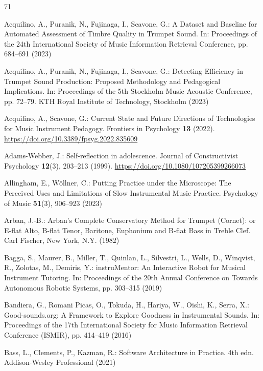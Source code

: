 \documentclass[runningheads]{llncs}
\begin{document}
\begin{thebibliography}{71}
\sloppy
\raggedright

Acquilino, A., Puranik, N., Fujinaga, I., Scavone, G.: A Dataset and Baseline for Automated Assessment of Timbre Quality in Trumpet Sound. In: Proceedings of the 24th International Society of Music Information Retrieval Conference, pp. 684--691 (2023)

Acquilino, A., Puranik, N., Fujinaga, I., Scavone, G.: Detecting Efficiency in Trumpet Sound Production: Proposed Methodology and Pedagogical Implications. In: Proceedings of the 5th Stockholm Music Acoustic Conference, pp. 72--79. KTH Royal Institute of Technology, Stockholm (2023)

Acquilino, A., Scavone, G.: Current State and Future Directions of Technologies for Music Instrument Pedagogy. Frontiers in Psychology \textbf{13} (2022). \url{https://doi.org/10.3389/fpsyg.2022.835609}

Adams-Webber, J.: Self-reflection in adolescence. Journal of Constructivist Psychology \textbf{12}(3), 203--213 (1999). \url{https://doi.org/10.1080/107205399266073}

Allingham, E., Wöllner, C.: Putting Practice under the Microscope: The Perceived Uses and Limitations of Slow Instrumental Music Practice. Psychology of Music \textbf{51}(3), 906--923 (2023)

Arban, J.-B.: Arban's Complete Conservatory Method for Trumpet (Cornet): or E-flat Alto, B-flat Tenor, Baritone, Euphonium and B-flat Bass in Treble Clef. Carl Fischer, New York, N.Y. (1982)

Bagga, S., Maurer, B., Miller, T., Quinlan, L., Silvestri, L., Wells, D., Winqvist, R., Zolotas, M., Demiris, Y.: instruMentor: An Interactive Robot for Musical Instrument Tutoring. In: Proceedings of the 20th Annual Conference on Towards Autonomous Robotic Systems, pp. 303--315 (2019)

Bandiera, G., Romani Picas, O., Tokuda, H., Hariya, W., Oishi, K., Serra, X.: Good-sounds.org: A Framework to Explore Goodness in Instrumental Sounds. In: Proceedings of the 17th International Society for Music Information Retrieval Conference (ISMIR), pp. 414--419 (2016)

Bass, L., Clements, P., Kazman, R.: Software Architecture in Practice. 4th edn. Addison-Wesley Professional (2021)


\end{thebibliography}
\end{document}
